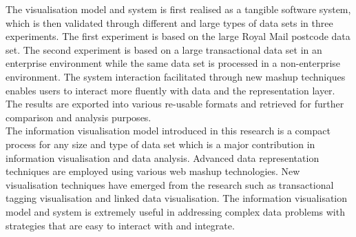 \documentclass[12pt, oneside]{Thesis} %
\begin{document}
The visualisation model and system is first realised as a tangible software system, which is then validated through different and large types of data sets in three experiments. The first experiment is based on the large Royal Mail postcode data set. The second experiment is based on a large transactional data set in an enterprise environment while the same data set is processed in a non-enterprise environment. The system interaction facilitated through new mashup techniques enables users to interact more fluently with data and the representation layer. The results are exported into various re-usable formats and retrieved for further comparison and analysis purposes.\\

The information visualisation model introduced in this research is a compact process for any size and type of data set which is a major contribution in information visualisation and data analysis. Advanced data representation techniques are employed using various web mashup technologies. New visualisation techniques have emerged from the research such as transactional tagging visualisation and linked data visualisation. The information visualisation model and system is extremely useful in addressing complex data problems with strategies that are easy to interact with and integrate.\\



\clearpage %


\pagestyle{empty} %




\end{document}
